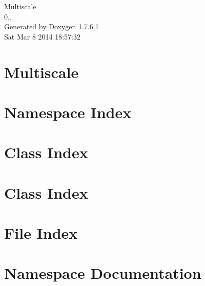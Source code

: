 \documentclass[a4paper]{book}
\begin{document}
\hypersetup{pageanchor=false,citecolor=blue}
\begin{titlepage}
\vspace*{7cm}
\begin{center}
{\Large \-Multiscale \\[1ex]\large 0.. }\\
\vspace*{1cm}
{\large \-Generated by Doxygen 1.7.6.1}\\
\vspace*{0.5cm}
{\small Sat Mar 8 2014 18:57:32}\\
\end{center}
\end{titlepage}
\clearemptydoublepage
{}
\tableofcontents
\clearemptydoublepage
{}
\hypersetup{pageanchor=true,citecolor=blue}
\chapter{\-Multiscale}
\label{index}\hypertarget{index}{}
\chapter{\-Namespace \-Index}

\chapter{\-Class \-Index}

\chapter{\-Class \-Index}

\chapter{\-File \-Index}

\chapter{\-Namespace \-Documentation}






\end{document}
